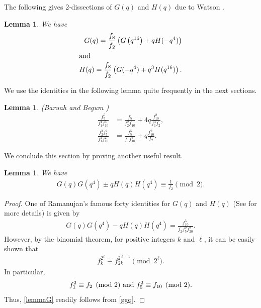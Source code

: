 \documentclass[12pt]{amsart}
\newtheorem{lemma}[theorem]{Lemma}
\theoremstyle{definition}
\numberwithin{equation}{section}
\begin{document}
The following gives 2-dissections of $G(q)$ and $H(q)$ due to Watson \cite[p.~60]{watson}.
\begin{lemma}We have
\begin{align}
    G(q)=\frac{f_8}{f_2}\left(G\left(q^{16}\right)+qH(-q^4)\right)\label{c5}\\\intertext{and}
    H(q)=\frac{f_8}{f_2}\left(G(-q^{4})+q^3H(q^{16})\right)\label{watson}.
\end{align}
    \end{lemma}
   
    We use the identities in the following lemma quite frequently in the next sections.
\begin{lemma}\label{lemmabb}
\textnormal{(Baruah and Begum \cite[Eqs. (2.6) and (2.7)]{ND})}
    \begin{align}
        \frac{f_5^5}{f_1^4f_{10}^3}&=\frac{f_5}{f_2^2f_{10}}+4q\frac{f_{10}^2}{f_1^3f_2},\label{Lemma4a}\\
        \frac{f_2^3f_5^2}{f_1^2f_{10}^2}&=\frac{f_5^5}{f_1f_{10}^3}+q\frac{f_{10}^2}{f_2}.\label{Lemma4b}
     \end{align}
\end{lemma}

We conclude this section by proving another useful result.
\begin{lemma} We have
    \begin{align}\label{lemmaG}
        G(q)G(q^4)\pm qH(q)H(q^4)\equiv \frac{1}{f_2}\pmod{2}.
    \end{align}
\end{lemma}
\begin{proof}
 One of Ramanujan's famous forty identities for $G(q)$ and $H(q)$ (See \cite{bcbetal} for more details) is given by
    \begin{align}
        G(q)G(q^4)-qH(q)H(q^4)=\frac{f_{10}^5}{f_2f_5^2f_{20}^2}.\label{ggq}
    \end{align}
    However, by the binomial theorem, for positive integers $k$ and $\ell$, it can be easily shown that
\begin{align}
    f_{k}^{2^\ell}\equiv f_{2k}^{2^{\ell-1}}\pmod{2^\ell}.\label{binom}
\end{align}
 In particular,
 \begin{align*}
    f_1^2\equiv f_2\pmod{2}~\textup{and}~f_5^2\equiv f_{10}\pmod{2}.
\end{align*}
Thus, \eqref{lemmaG} readily follows from \eqref{ggq}.
\end{proof} 
\end{document}
